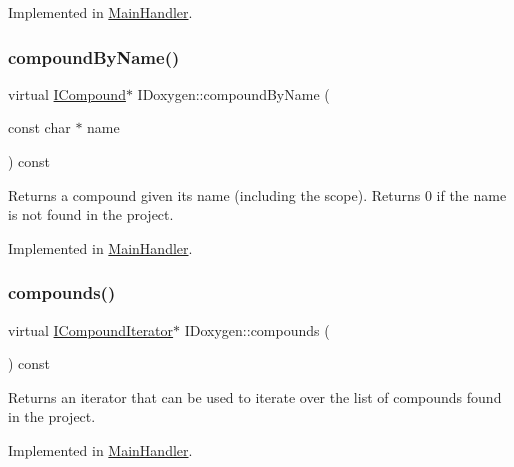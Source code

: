 Implemented in \mbox{\hyperlink{class_main_handler_acd8c995e041bda4396f562da9fb44a91}{Main\+Handler}}.

\mbox{\label{class_i_doxygen_a8da2fb55aad2aa941b2c529a5f1361aa}} 
\subsubsection{\texorpdfstring{compoundByName()}{compoundByName()}\hspace{0.1cm}{\footnotesize\ttfamily [2/2]}}
{\footnotesize\ttfamily virtual \mbox{\hyperlink{class_i_compound}{I\+Compound}}$\ast$ I\+Doxygen\+::compound\+By\+Name (\begin{DoxyParamCaption}\item[{const char $\ast$}]{name }\end{DoxyParamCaption}) const\hspace{0.3cm}{\ttfamily [pure virtual]}}

Returns a compound given its name (including the scope). Returns 0 if the name is not found in the project. 

Implemented in \mbox{\hyperlink{class_main_handler_acd8c995e041bda4396f562da9fb44a91}{Main\+Handler}}.

\mbox{\label{class_i_doxygen_acdee4e3efe347f2d97363fdf80609e6e}} 
\subsubsection{\texorpdfstring{compounds()}{compounds()}\hspace{0.1cm}{\footnotesize\ttfamily [1/2]}}
{\footnotesize\ttfamily virtual \mbox{\hyperlink{class_i_compound_iterator}{I\+Compound\+Iterator}}$\ast$ I\+Doxygen\+::compounds (\begin{DoxyParamCaption}{ }\end{DoxyParamCaption}) const\hspace{0.3cm}{\ttfamily [pure virtual]}}

Returns an iterator that can be used to iterate over the list of compounds found in the project. 

Implemented in \mbox{\hyperlink{class_main_handler_a194b44299530605b43364905f2868158}{Main\+Handler}}.

